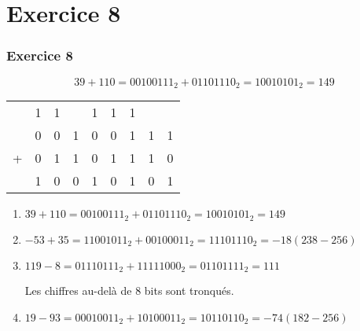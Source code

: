 \documentclass[svgnames,11pt]{beamer}
\begin{document}
\section{Exercice 8}
\begin{frame}
    \frametitle{Exercice 8}
    $$39+110=00100111_2+01101110_2=10010101_2=149$$
    \begin{center}
        \begin{tabular}{*{9}{c}}
              & {\small 1}&  {\small 1} &   & {\small 1} & {\small 1} &  {\small 1} &   &    \\
              & 0 & 0 & 1 & 0 & 0 & 1 & 1 & 1 \\
            + & 0 & 1 & 1 & 0 & 1 & 1 & 1 & 0 \\
            \hline
              & 1 & 0 & 0 & 1 & 0 & 1 & 0 & 1 \\
        \end{tabular}
    \end{center}

\end{frame}
\begin{frame}

    \begin{enumerate}
        \item $39+110=00100111_2+01101110_2=10010101_2=149$ 
        \item $-53+35=11001011_2+00100011_2=11101110_2=-18 (238-256)$
        \item $119-8=01110111_2+11111000_2=01101111_2=111$ 
        \begin{aretenir}[Remarque]
            Les chiffres au-delà de 8 bits sont tronqués.
        \end{aretenir}
        \item $19-93=00010011_2+10100011_2=10110110_2=-74 (182-256)$
    \end{enumerate}

\end{frame}
\end{document}
